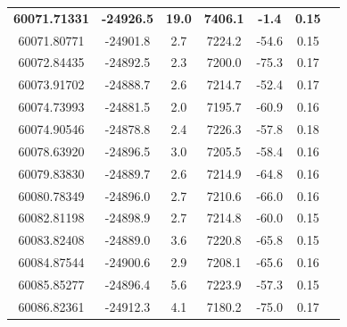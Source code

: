 \documentclass[fleqn,usenatbib,useAMS]{mnras}
\begin{document}
\begin{table}
\begin{tabular}[t]{ccccccc}
\textbf{60071.71331} & \textbf{-24926.5} & \textbf{19.0} & \textbf{7406.1} & \textbf{-1.4} & \textbf{0.15}\\
60071.80771 & -24901.8 & 2.7 & 7224.2 & -54.6 & 0.15\\
60072.84435 & -24892.5 & 2.3 & 7200.0 & -75.3 & 0.17\\ 
60073.91702 & -24888.7 & 2.6 & 7214.7 & -52.4 & 0.17\\ 
60074.73993 & -24881.5 & 2.0 & 7195.7 & -60.9 & 0.16\\ 
60074.90546 & -24878.8 & 2.4 & 7226.3 & -57.8 & 0.18\\ 
60078.63920 & -24896.5 & 3.0 & 7205.5 & -58.4 & 0.16\\ 
60079.83830 & -24889.7 & 2.6 & 7214.9 & -64.8 & 0.16\\ 
60080.78349 & -24896.0 & 2.7 & 7210.6 & -66.0 & 0.16\\ 
60082.81198 & -24898.9 & 2.7 & 7214.8 & -60.0 & 0.15\\ 
60083.82408 & -24889.0 & 3.6 & 7220.8 & -65.8 & 0.15\\
60084.87544 & -24900.6 & 2.9 & 7208.1 & -65.6 & 0.16\\
60085.85277 & -24896.4 & 5.6 & 7223.9 & -57.3 & 0.15\\
60086.82361 & -24912.3 & 4.1 & 7180.2 & -75.0 & 0.17\\ 
\end{tabular}
\end{table}
\end{document}
